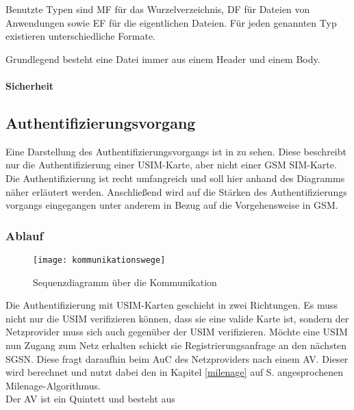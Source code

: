 Benutzte Typen sind \ac{MF} für das Wurzelverzeichnis,
\ac{DF} für Dateien von Anwendungen sowie
\ac{EF} für die eigentlichen Dateien. Für jeden genannten Typ
existieren unterschiedliche Formate.

Grundlegend besteht eine Datei immer aus einem Header und einem Body.

\paragraph{Sicherheit}

\clearpage

\subsection{Authentifizierungsvorgang}
\label{authentifizierungsvorgang}

Eine Darstellung des Authentifizierungsvorgangs ist in  zu
sehen. Diese beschreibt nur die Authentifizierung einer \ac{USIM}-Karte, aber nicht einer
GSM \ac{SIM}-Karte. \\
Die Authentifizierung ist recht umfangreich und soll hier anhand des Diagramms näher
erläutert werden. Anschließend wird auf die Stärken des Authentifizierungs\-
vorgangs eingegangen unter anderem in Bezug auf die Vorgehensweise in GSM.

 \subsubsection{Ablauf}
 
 \begin{figure}[htp]
 \begin{center}
  \texttt{[image: kommunikationswege]}
 \end{center}
 \caption[Sequenzdiagramm über die Kommunikation zwischen SIM-Karte und Authentication Center]{Sequenzdiagramm über die Kommunikation}
 \label{fig:kommunikationswege}
\end{figure}

 Die Authentifizierung mit \ac{USIM}-Karten geschieht in zwei Richtungen. Es muss nicht nur die
 USIM verifizieren können, dass sie eine valide Karte ist, sondern der Netzprovider muss sich auch
 gegenüber der USIM verifizieren. Möchte eine USIM nun Zugang zum Netz erhalten schickt sie
 Registrierungsanfrage an den nächsten \ac{SGSN}. Diese fragt daraufhin beim \ac{AuC} des
 Netzproviders nach einem \ac{AV}. Dieser wird berechnet und nutzt dabei den in Kapitel
 \ref{milenage} auf S. \pageref{milenage} angesprochenen Milenage-Algorithmus. \\
 Der AV ist ein Quintett und besteht aus
 
